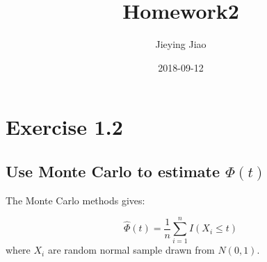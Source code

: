 \documentclass[]{book}
\title{Homework2}
\author{Jieying Jiao}
\date{2018-09-12}
\begin{document}
\maketitle

{
\setcounter{tocdepth}{1}
\tableofcontents
}
\hypertarget{exercise-1.2}{%
\chapter{Exercise 1.2}\label{exercise-1.2}}

\hypertarget{use-monte-carlo-to-estimate-phit}{%
\section{\texorpdfstring{Use Monte Carlo to estimate
\(\Phi(t)\)}{Use Monte Carlo to estimate \textbackslash{}Phi(t)}}\label{use-monte-carlo-to-estimate-phit}}

The Monte Carlo methods gives:

\[\hat{\Phi}(t) = \frac{1}{n}\sum_{i = 1}^nI(X_i\leqslant t)\] where
\(X_i\) are random normal sample drawn from \(N(0, 1)\).
\end{document}
